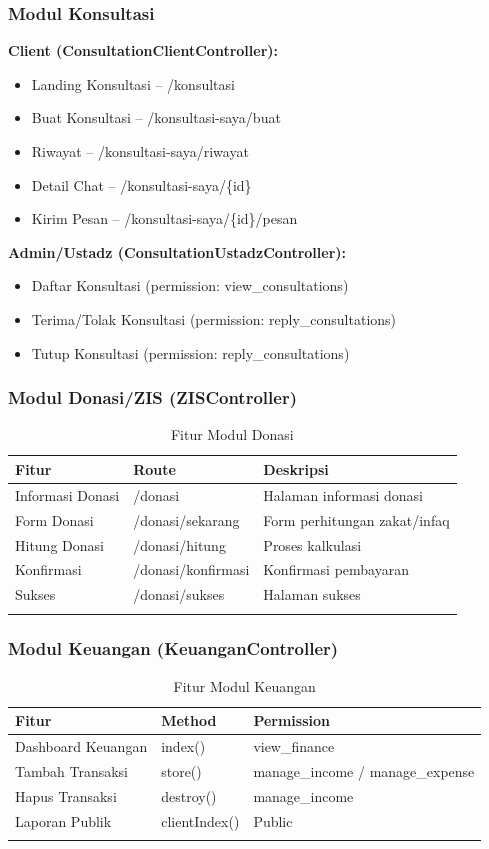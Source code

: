 \documentclass[12pt,a4paper]{article}
\begin{document}
\subsubsection{Modul Konsultasi}
\textbf{Client (ConsultationClientController):}
\begin{itemize}
    \item Landing Konsultasi -- /konsultasi
    \item Buat Konsultasi -- /konsultasi-saya/buat
    \item Riwayat -- /konsultasi-saya/riwayat
    \item Detail Chat -- /konsultasi-saya/\{id\}
    \item Kirim Pesan -- /konsultasi-saya/\{id\}/pesan
\end{itemize}

\textbf{Admin/Ustadz (ConsultationUstadzController):}
\begin{itemize}
    \item Daftar Konsultasi (permission: view\_consultations)
    \item Terima/Tolak Konsultasi (permission: reply\_consultations)
    \item Tutup Konsultasi (permission: reply\_consultations)
\end{itemize}

\subsubsection{Modul Donasi/ZIS (ZISController)}
\begin{longtable}{|l|l|p{5cm}|}
\hline
\textbf{Fitur} & \textbf{Route} & \textbf{Deskripsi} \\
\hline
Informasi Donasi & /donasi & Halaman informasi donasi \\
Form Donasi & /donasi/sekarang & Form perhitungan zakat/infaq \\
Hitung Donasi & /donasi/hitung & Proses kalkulasi \\
Konfirmasi & /donasi/konfirmasi & Konfirmasi pembayaran \\
Sukses & /donasi/sukses & Halaman sukses \\
\hline
\caption{Fitur Modul Donasi}
\end{longtable}

\subsubsection{Modul Keuangan (KeuanganController)}
\begin{longtable}{|l|l|l|}
\hline
\textbf{Fitur} & \textbf{Method} & \textbf{Permission} \\
\hline
Dashboard Keuangan & index() & view\_finance \\
Tambah Transaksi & store() & manage\_income / manage\_expense \\
Hapus Transaksi & destroy() & manage\_income \\
Laporan Publik & clientIndex() & Public \\
\hline
\caption{Fitur Modul Keuangan}
\end{longtable}
\end{document}
